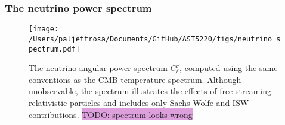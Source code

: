 \documentclass{aa}
\numberwithin{equation}{section}
\numberwithin{table}{section}
\numberwithin{figure}{section}
\begin{document}



\subsubsection{The neutrino power spectrum}

\begin{figure}
  \centering
  \texttt{[image: /Users/paljettrosa/Documents/GitHub/AST5220/figs/neutrino\_spectrum.pdf]}
  \caption{The neutrino angular power spectrum $C_\ell^\nu$, computed using the same conventions as the CMB temperature spectrum. Although unobservable, the spectrum illustrates the effects of free-streaming relativistic particles and includes only Sachs-Wolfe and ISW contributions. \colorbox{Plum}{TODO: spectrum looks wrong}}\label{fig:neutrino spectrum}
\end{figure}


\end{document}
